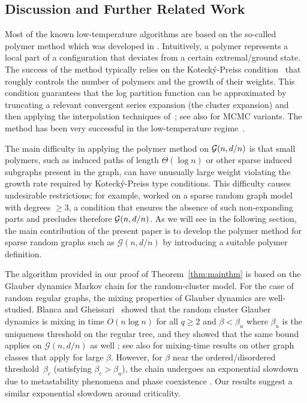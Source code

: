 \documentclass[11pt]{article}
\theoremstyle{plain}
\newcommand{\G}{\mathcal{G}}
\newcommand{\1}{\mathbb{1}}
\begin{document}
\subsection{Discussion and Further Related Work}

Most of the known low-temperature algorithms are based on the so-called polymer method which was developed in \cite{helmuth2019algorithmic, doi:10.1137/19M1286669}. Intuitively, a polymer represents a local part of a configuration that deviates from a certain  extremal/ground state. The success of the method typically relies on the Koteck\'y-Preiss condition~\cite{KP} that roughly controls the number of polymers and the growth of their weights.  This condition guarantees that the log partition function can be approximated by truncating a relevant convergent series expansion (the cluster expansion) and then applying the interpolation techniques of~\cite{barvinokbook,PR}; see also \cite{fastpolymers} for MCMC variants. The 
method has been 
very successful  in the low-temperature regime~\cite{helmuth2019algorithmic, doi:10.1137/19M1286669,  
liao2019counting, Pottsexp, RCM-Helmuth2020, Unique, 10.1145/3470865,containers1, spectral, 10756117}. 

The main difficulty in applying the polymer method on ${\cal G}(n,d/n)$ is that small polymers, such as induced paths of length $\Theta(\log n)$ or other sparse induced subgraphs present in the graph, can have unusually large weight violating the growth rate required by Koteck\'y-Preiss type conditions. This difficulty causes undesirable restrictions; for example, \cite{GALANIS2022104894} worked on a  sparse random graph model with degrees $\geq 3$, a condition that ensures the absence of such non-expanding parts and precludes therefore ${\cal G}(n,d/n)$. As we will see in the following section, the main contribution of the present paper is to develop the polymer method for sparse random graphs such as $\mathcal{G}(n,d/n)$ by introducing a suitable polymer definition.



The algorithm provided in our proof of Theorem~\ref{thm:mainthm} 
is based on the    Glauber dynamics Markov chain for the random-cluster model. For the case of random regular graphs, the mixing properties of Glauber dynamics are  well-studied. Blanca and Gheissari~\cite{Blanca2}  showed that the random cluster Glauber dynamics is mixing in time \(O(n\log n)\) for all \(q\geq 2\) and \(\beta < \beta_u\) where $\beta_u$ is 
the uniqueness threshold on the regular tree, and they showed that the same bound applies on $\G(n,d/n)$ as well \cite{rcm-on-unbounded-degree-graphs}; see also \cite{BlaGhe} for mixing-time results on other graph classes that apply for large $\beta$. However, for \(\beta \) near the  ordered/disordered threshold~$\beta_c$ (satisfying $\beta_c>\beta_u$),   the chain undergoes an exponential slowdown due to metastability phenomena and phase coexistence \cite{RCM-Helmuth2020,coja2023}. Our results suggest a similar exponential slowdown around criticality. 
\end{document}

